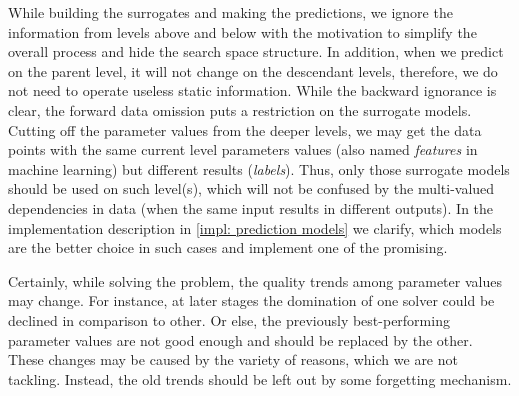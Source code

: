 While building the surrogates and making the predictions, we ignore the information from levels above and below with the motivation to simplify the overall process and hide the search space structure. In addition, when we predict on the parent level, it will not change on the descendant levels, therefore, we do not need to operate useless static information. While the backward ignorance is clear, the forward data omission puts a restriction on the surrogate models. Cutting off the parameter values from the deeper levels, we may get the data points with the same current level parameters values (also named \emph{features} in machine learning) but different results (\emph{labels}). Thus, only those surrogate models should be used on such level(s), which will not be confused by the multi-valued dependencies in data (when the same input results in different outputs). In the implementation description in \cref{impl: prediction models} we clarify, which models are the better choice in such cases and implement one of the promising.

Certainly, while solving the problem, the quality trends among parameter values may change. For instance, at later stages the domination of one solver could be declined in comparison to other. Or else, the previously best-performing parameter values are not good enough and should be replaced by the other. These changes may be caused by the variety of reasons, which we are not tackling. Instead, the old trends should be left out by some forgetting mechanism.

